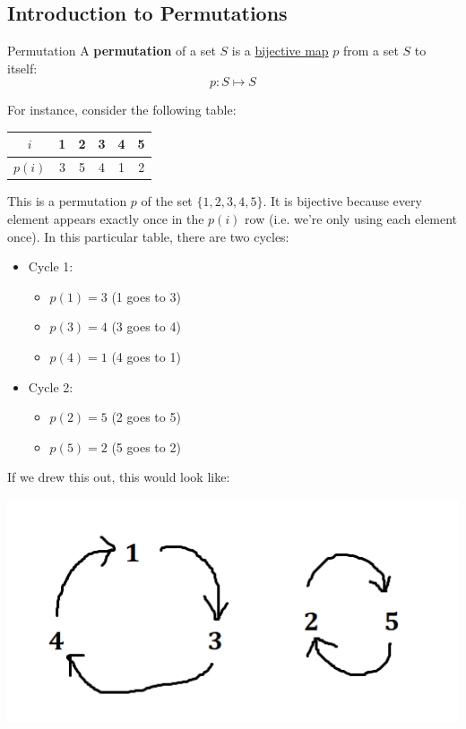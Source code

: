 \documentclass[letterpaper]{article}
\begin{document}
\subsection{Introduction to Permutations}
\begin{definition}{Permutation}{}
    A \textbf{permutation} of a set $S$ is a \underline{bijective map} $p$ from a set $S$ to itself: 
    \[p: S \mapsto S\]
\end{definition}
For instance, consider the following table: 
\begin{center}
    \begin{tabular}{|c|c c c c c|}
        \hline 
        $i$ & 1 & 2 & 3 & 4 & 5 \\ 
        \hline 
        $p(i)$ & 3 & 5 & 4 & 1 & 2 \\ 
        \hline 
    \end{tabular}
\end{center}
This is a permutation $p$ of the set $\{1, 2, 3, 4, 5\}$. It is bijective because every element appears exactly once in the $p(i)$ row (i.e. we're only using each element once). In this particular table, there are two cycles:
\begin{itemize}
    \item Cycle 1: 
    \begin{itemize}
        \item $p(1) = 3$ (1 goes to 3)
        \item $p(3) = 4$ (3 goes to 4)
        \item $p(4) = 1$ (4 goes to 1)
    \end{itemize}
    \item Cycle 2: 
    \begin{itemize}
        \item $p(2) = 5$ (2 goes to 5)
        \item $p(5) = 2$ (5 goes to 2)
    \end{itemize}
\end{itemize}
If we drew this out, this would look like: 
\begin{center}
    \includegraphics[scale=0.7]{assets/permutation_134_25.png}
\end{center}
\end{document}

